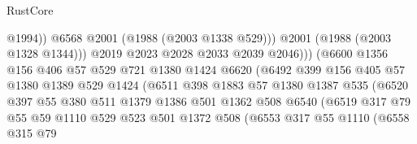 \begin{lexlean}{RustCore}
\begin{coremodule}
                                        @1994))
                                    @6568
                                    @2001
                                    (@1988 (@2003 @1338 @529)))
                                  @2001
                                  (@1988 (@2003 @1328 @1344)))
                                @2019
                                @2023
                                @2028
                                @2033
                                @2039
                                @2046)))
                          (@6600
                            @1356
                            @156
                            @406
                            @57
                            @529
                            @721
                            @1380
                            @1424
                            @6620
                            (@6492
                              @399
                              @156
                              @405
                              @57
                              @1380
                              @1389
                              @529
                              @1424
                              (@6511
                                @398
                                @1883
                                @57
                                @1380
                                @1387
                                @535
                                (@6520
                                  @397
                                  @55
                                  @380
                                  @511
                                  @1379
                                  @1386
                                  @501
                                  @1362
                                  @508
                                  @6540
                                  (@6519
                                    @317
                                    @79
                                    @55
                                    @59
                                    @1110
                                    @529
                                    @523
                                    @501
                                    @1372
                                    @508
                                    (@6553
                                      @317
                                      @55
                                      @1110
                                      (@6558
                                        @315
                                        @79

\end{coremodule}
\end{lexlean}
